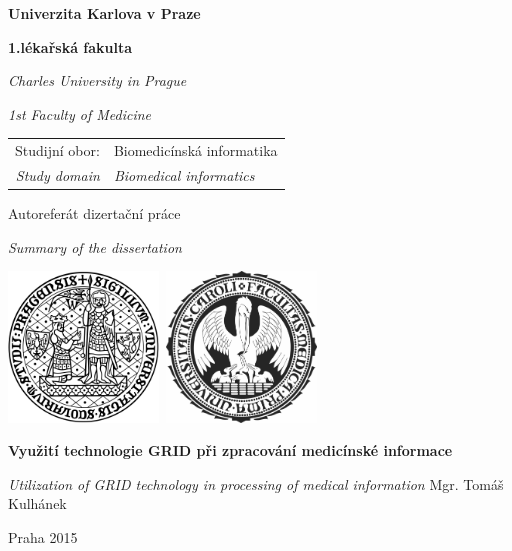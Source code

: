 \begin{center}
\large
\textbf{\Large{Univerzita Karlova v Praze}}

\textbf{\Large{1.lékařská fakulta}} 

\textit{Charles University in Prague} 

\textit{1st Faculty of Medicine}
\vfill
\normalsize
\begin{tabular}{rl}
Studijní obor:  & Biomedicínská informatika \\
\noalign{\vspace{-1mm}}
\textit{Study domain} & \textit{Biomedical informatics} \\
\end{tabular}

\vfill

{\Large Autoreferát dizertační práce}

\textit{\large Summary of the dissertation}

\vfill

\centerline{\mbox{\includegraphics[width=40mm]{../img/logouk.png}
\includegraphics[width=40mm]{../img/logolf1.png}}}


\vfill



\textbf{\large Využití technologie GRID při zpracování medicínské informace}

\vspace{2mm}
\textit{\large Utilization of GRID technology in processing of medical information}
\vfill
{\Large Mgr. Tomáš Kulhánek}




\vfill

Praha 2015

\end{center}
